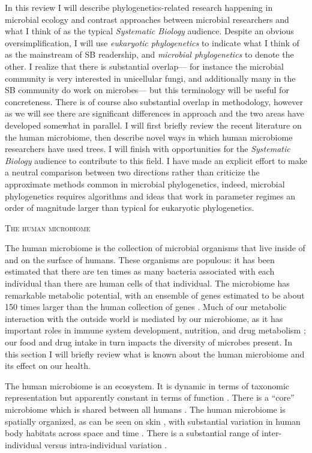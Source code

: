 \documentclass{amsart}
\renewcommand{\section}[1]{%
\bigskip
\begin{center}
\begin{Large}
\normalfont\scshape #1
\medskip
\end{Large}
\end{center}}
\begin{document}
In this review I will describe phylogenetics-related research happening in microbial ecology and contrast approaches between microbial researchers and what I think of as the typical \emph{Systematic Biology} audience.
Despite an obvious oversimplification, I will use \textit{eukaryotic phylogenetics} to indicate what I think of as the mainstream of SB readership, and \textit{microbial phylogenetics} to denote the other.
I realize that there is substantial overlap--- for instance the microbial community is very interested in unicellular fungi, and additionally many in the SB community do work on microbes--- but this terminology will be useful for concreteness.
There is of course also substantial overlap in methodology, however as we will see there are significant differences in approach and the two areas have developed somewhat in parallel.
I will first briefly review the recent literature on the human microbiome, then describe novel ways in which human microbiome researchers have used trees.
I will finish with opportunities for the \textit{Systematic Biology} audience to contribute to this field.
I have made an explicit effort to make a neutral comparison between two directions rather than criticize the approximate methods common in microbial phylogenetics, indeed, microbial phylogenetics requires algorithms and ideas that work in parameter regimes an order of magnitude larger than typical for eukaryotic phylogenetics.

\section{The human microbiome}
The human microbiome is the collection of microbial organisms that live inside of and on the surface of humans.
These organisms are populous: it has been estimated that there are ten times as many bacteria associated with each individual than there are human cells of that individual.
The microbiome has remarkable metabolic potential, with an ensemble of genes estimated to be about 150 times larger than the human collection of genes \citep{qin2010human}.
Much of our metabolic interaction with the outside world is mediated by our microbiome, as it has important roles in immune system development, nutrition, and drug metabolism \citep{kau2011human,maurice2013xenobiotics}; our food and drug intake in turn impacts the diversity of microbes present.
In this section I will briefly review what is known about the human microbiome and its effect on our health.

The human microbiome is an ecosystem.
It is dynamic in terms of taxonomic representation but apparently constant in terms of function \citep{hmp2012structure}.
There is a ``core'' microbiome which is shared between all humans \citep{turnbaugh2008core}.
The human microbiome is spatially organized, as can be seen on skin \citep{grice2009topographical}, with substantial variation in human body habitats across space and time \citep{costello2009bacterial}.
There is a substantial range of inter-individual versus intra-individual variation \citep{hmp2012structure}.
\end{document}
